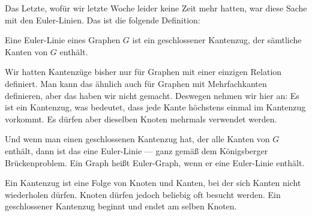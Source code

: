 \begin{spoken-clean}[00:03:38 - 00:05:40]
Das Letzte, wofür wir letzte Woche leider keine Zeit mehr hatten, war diese Sache mit den Euler-Linien. Das ist die folgende Definition:

Eine Euler-Linie eines Graphen $G$ ist ein geschlossener Kantenzug, der sämtliche Kanten von $G$ enthält.

Wir hatten Kantenzüge bisher nur für Graphen mit einer einzigen Relation definiert. Man kann das ähnlich auch für Graphen mit Mehrfachkanten definieren, aber das haben wir nicht gemacht. Deswegen nehmen wir hier an: Es ist ein Kantenzug, was bedeutet, dass jede Kante höchstens einmal im Kantenzug vorkommt. Es dürfen aber dieselben Knoten mehrmals verwendet werden.

Und wenn man einen geschlossenen Kantenzug hat, der alle Kanten von $G$ enthält, dann ist das eine Euler-Linie --- ganz gemäß dem Königsberger Brückenproblem. Ein Graph heißt Euler-Graph, wenn er eine Euler-Linie enthält.
\end{spoken-clean}

\begin{math-stroke}

\begin{explanation-of-steps}
Ein Kantenzug ist eine Folge von Knoten und Kanten, bei der sich Kanten nicht wiederholen dürfen. Knoten dürfen jedoch beliebig oft besucht werden. Ein geschlossener Kantenzug beginnt und endet am selben Knoten.
\end{explanation-of-steps}
\end{math-stroke}

\begin{ai-global-state-checkpoint-invisible-content}
\end{ai-global-state-checkpoint-invisible-content}

